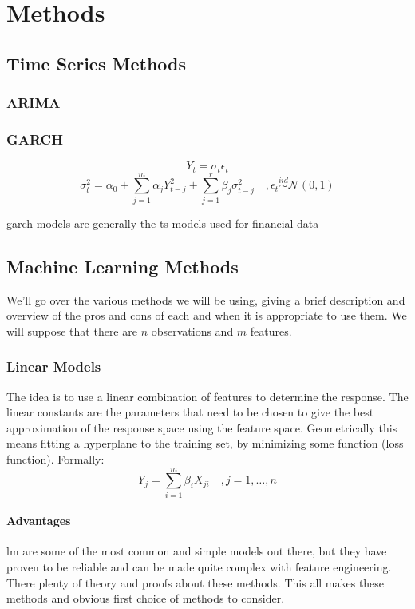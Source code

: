 \chapter{Methods}

\section{Time Series Methods}
\subsection{ARIMA}
\subsection{GARCH}

$$
Y_t = \sigma_t \epsilon_t
$$
$$
\sigma_t^2 = \alpha_0 + \sum_{j=1}^m \alpha_j Y_{t-j}^2 + \sum_{j=1}^r \beta_j \sigma_{t-j}^2
\quad, \epsilon_t \stackrel{iid}{\sim} \mathcal{N}(0,1)
$$

\acrshort{garch} models are generally the \acrlong{ts} models used for financial data

\section{Machine Learning Methods}
We'll go over the various methods we will be using, giving a brief description and overview of the pros and cons of each and when it is appropriate to use them.
We will suppose that there are $n$ observations and $m$ features.


\subsection{Linear Models}
The idea is to use a linear combination of features to determine the response. The linear constants are the parameters that need to be chosen to give the best approximation of the response space using the feature space. Geometrically this means fitting a hyperplane to the training set, by minimizing some function (loss function).
Formally:
$$
Y_j = \sum_{i=1}^m \beta_{i} X_{ji} \quad, j=1,\dots,n
$$

\subsubsection{Advantages}
\acrlong{lm} are some of the most common and simple models out there, but they have proven to be reliable and can be made quite complex with feature engineering. There plenty of theory and proofs about these methods. This all makes these methods and obvious first choice of methods to consider.
